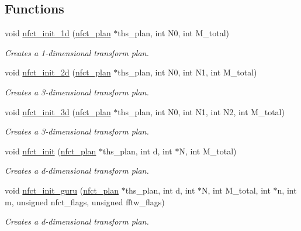 \subsection*{Functions}
\begin{CompactItemize}
\item 
void \hyperlink{group__nfsct_ga0}{nfct\_\-init\_\-1d} (\hyperlink{structnfct__plan}{nfct\_\-plan} $\ast$ths\_\-plan, int N0, int M\_\-total)
\begin{CompactList}\small\item\em Creates a 1-dimensional transform plan. \item\end{CompactList}\item 
void \hyperlink{group__nfsct_ga1}{nfct\_\-init\_\-2d} (\hyperlink{structnfct__plan}{nfct\_\-plan} $\ast$ths\_\-plan, int N0, int N1, int M\_\-total)
\begin{CompactList}\small\item\em Creates a 3-dimensional transform plan. \item\end{CompactList}\item 
void \hyperlink{group__nfsct_ga2}{nfct\_\-init\_\-3d} (\hyperlink{structnfct__plan}{nfct\_\-plan} $\ast$ths\_\-plan, int N0, int N1, int N2, int M\_\-total)
\begin{CompactList}\small\item\em Creates a 3-dimensional transform plan. \item\end{CompactList}\item 
void \hyperlink{group__nfsct_ga3}{nfct\_\-init} (\hyperlink{structnfct__plan}{nfct\_\-plan} $\ast$ths\_\-plan, int d, int $\ast$N, int M\_\-total)
\begin{CompactList}\small\item\em Creates a d-dimensional transform plan. \item\end{CompactList}\item 
void \hyperlink{group__nfsct_ga4}{nfct\_\-init\_\-guru} (\hyperlink{structnfct__plan}{nfct\_\-plan} $\ast$ths\_\-plan, int d, int $\ast$N, int M\_\-total, int $\ast$n, int m, unsigned nfct\_\-flags, unsigned fftw\_\-flags)
\begin{CompactList}\small\item\em Creates a d-dimensional transform plan. \item\end{CompactList}\item 

\end{CompactItemize}

